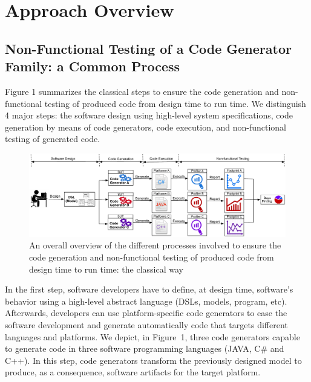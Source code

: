 
\section{Approach Overview}


\subsection{Non-Functional Testing of a Code Generator Family: a Common Process}

Figure 1 summarizes the classical steps to ensure the code generation and non-functional testing of produced code from design time to run time. 
We distinguish 4 major steps: the software design using high-level system specifications, code generation by means of code generators, code execution, and non-functional testing of generated code. 


\begin{figure}[t]
		\center
		
	\includegraphics[width=0.95\linewidth]{Ressources/background.pdf}
	\caption{An overall overview of the different processes involved to ensure the code generation and non-functional testing of produced code from design time to run time: the classical way}
\end{figure}


In the first step, software developers have to define, at design time, software's behavior using a high-level abstract language (DSLs, models, program, etc). Afterwards, developers can use platform-specific code generators to ease the software development and generate automatically code that targets different languages and platforms. We depict, in Figure~1, three code generators capable to generate code in three software programming languages (JAVA, C\# and C++). In this step, code generators transform the previously designed model to produce, as a consequence, software artifacts for the target platform.

